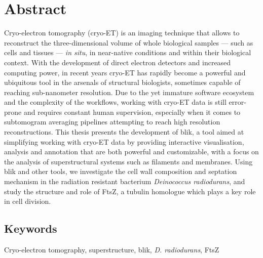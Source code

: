 \section*{Abstract}

Cryo-electron tomography (cryo-ET) is an imaging technique that allows to reconstruct the three-dimensional volume of whole biological samples --- such as cells and tissues --- \textit{in situ}, in near-native conditions and within their biological context.
With the development of direct electron detectors and increased computing power, in recent years cryo-ET has rapidly become a powerful and ubiquitous tool in the arsenals of structural biologists, sometimes capable of reaching sub-nanometer resolution.
Due to the yet immature software ecosystem and the complexity of the workflows, working with cryo-ET data is still error-prone and requires constant human supervision, especially when it comes to subtomogram averaging pipelines attempting to reach high resolution reconstructions.
This thesis presents the development of blik, a tool aimed at simplifying working with cryo-ET data by providing interactive visualisation, analysis and annotation that are both powerful and customizable, with a focus on the analysis of superstructural systems such as filaments and membranes.
Using blik and other tools, we investigate the cell wall composition and septation mechanism in the radiation resistant bacterium \textit{Deinococcus radiodurans}, and study the structure and role of FtsZ, a tubulin homologue which plays a key role in cell division.

\subsection*{Keywords}
Cryo-electron tomography, superstructure, blik, \textit{D. radiodurans}, FtsZ

\newpage

